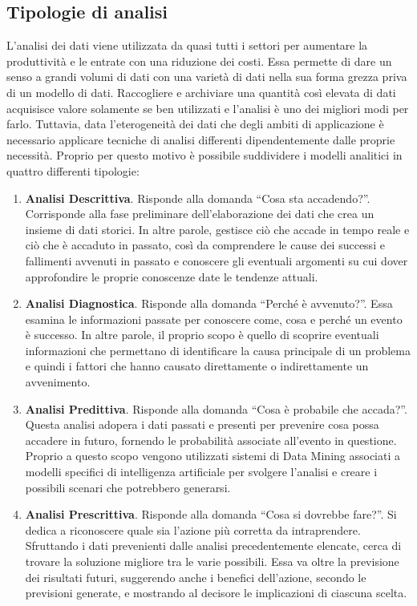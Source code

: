 \subsection{Tipologie di analisi}
L'analisi dei dati viene utilizzata da quasi tutti i settori per aumentare la produttività e le entrate con una riduzione dei costi. Essa permette di dare un senso a grandi volumi di dati con una varietà di dati nella sua forma grezza priva di un modello di dati. Raccogliere e archiviare una quantità così elevata di dati acquisisce valore solamente se ben utilizzati e l'analisi è uno dei migliori modi per farlo.\cite{researchgate_big_data_analytics}
Tuttavia, data l'eterogeneità dei dati che degli ambiti di applicazione è necessario applicare tecniche di analisi differenti dipendentemente dalle proprie necessità. Proprio per questo motivo è possibile suddividere i modelli analitici in quattro differenti tipologie\cite{big_data_analytics_harnessing_data_for_new_business_models}:

\begin{enumerate}
    \item \textbf{Analisi Descrittiva}. Risponde alla domanda “Cosa sta accadendo?”. Corrisponde alla fase preliminare dell'elaborazione dei dati che crea un insieme di dati storici. In altre parole, gestisce ciò che accade in tempo reale e ciò che è accaduto in passato, così da comprendere le cause dei successi e fallimenti avvenuti in passato e conoscere gli eventuali argomenti su cui dover approfondire le proprie conoscenze date le tendenze attuali.
    \item \textbf{Analisi Diagnostica}. Risponde alla domanda “Perché è avvenuto?”. Essa esamina le informazioni passate per conoscere come, cosa e perché un evento è successo. In altre parole, il proprio scopo è quello di scoprire eventuali informazioni che permettano di identificare la causa principale di un problema e quindi i fattori che hanno causato direttamente o indirettamente un avvenimento.
    \item \textbf{Analisi Predittiva}. Risponde alla domanda “Cosa è probabile che accada?”. Questa analisi adopera i dati passati e presenti per prevenire cosa possa accadere in futuro, fornendo le probabilità associate all'evento in questione. Proprio a questo scopo vengono utilizzati sistemi di Data Mining associati a modelli specifici di intelligenza artificiale per svolgere l'analisi e creare i possibili scenari che potrebbero generarsi.
    \item \textbf{Analisi Prescrittiva}. Risponde alla domanda “Cosa si dovrebbe fare?”. Si dedica a riconoscere quale sia l'azione più corretta da intraprendere. Sfruttando i dati prevenienti dalle analisi precedentemente elencate, cerca di trovare la soluzione migliore tra le varie possibili. Essa va oltre la previsione dei risultati futuri, suggerendo anche i benefici dell'azione, secondo le previsioni generate, e mostrando al decisore le implicazioni di ciascuna scelta.
\end{enumerate}

